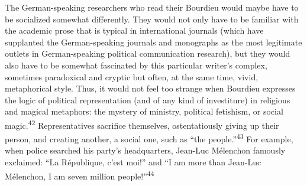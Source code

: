 \documentclass{tufte-handout}
\begin{document}
The German-speaking researchers who read their Bourdieu would maybe have
to be socialized somewhat differently. They would not only have to be
familiar with the academic prose that is typical in international
journals (which have supplanted the German-speaking journals and
monographs as the most legitimate outlets in German-speaking political
communication research), but they would also have to be somewhat
fascinated by this particular writer's complex, sometimes paradoxical
and cryptic but often, at the same time, vivid, metaphorical style.
Thus, it would not feel too strange when Bourdieu expresses the logic of
political representation (and of any kind of investiture) in religious
and magical metaphors: the mystery of ministry, political fetishism, or
social magic.\textsuperscript{42} Representatives sacrifice
themselves, ostentatiously giving up their person, and creating another,
a social one, such as ``the people.''\textsuperscript{43} For example, when police searched his
party's headquarters, Jean-Luc Mélenchon famously exclaimed: ``La
République, c'est moi!'' and ``I am more than Jean-Luc Mélenchon, I am
seven million people!''\textsuperscript{44}
\end{document}
